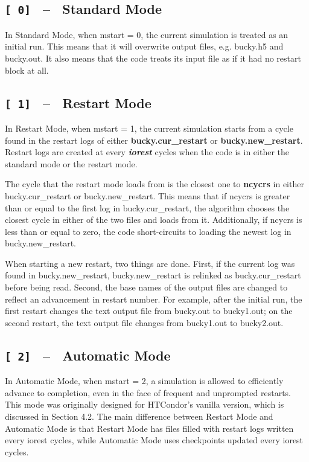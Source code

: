 
\subsection{\texttt{[ 0]} \ -- \ Standard Mode}

In Standard Mode, when mstart = 0, the current simulation is treated as an initial run.  This means that it will overwrite output files, e.g. bucky.h5 and bucky.out.  It also means that the code treats its input file as if it had no restart block at all.

\subsection{\texttt{[ 1]} \ -- \ Restart Mode }

In Restart Mode, when mstart = 1, the current simulation starts from a cycle found in the restart logs of either \textbf{bucky.cur\_restart} or \textbf{bucky.new\_restart}.  Restart logs are created at every \textbf{\textit{iorest}} cycles when the code is in either the standard mode or the restart mode.

\pagebreak

The cycle that the restart mode loads from is the closest one to \textbf{ncycrs} in either bucky.cur\_restart or bucky.new\_restart.  This means that if ncycrs is greater than or equal to the first log in bucky.cur\_restart, the algorithm chooses the closest cycle in either of the two files and loads from it.  Additionally, if ncycrs is less than or equal to zero, the code short-circuits to loading the newest log in bucky.new\_restart.

When starting a new restart, two things are done.  First, if the current log was found in bucky.new\_restart, bucky.new\_restart is relinked as bucky.cur\_restart before being read. Second, the base names of the output files are changed to reflect an advancement in restart number.  For example, after the initial run, the first restart changes the text output file from bucky.out to bucky1.out; on the second restart, the text output file changes from bucky1.out to bucky2.out.

\subsection{\texttt{[ 2]} \ -- \ Automatic Mode  }

In Automatic Mode, when mstart = 2, a simulation is allowed to efficiently advance to completion, even in the face of frequent and unprompted restarts.  This mode was originally designed for HTCondor's vanilla version, which is discussed in Section 4.2.  The main difference between Restart Mode and Automatic Mode is that Restart Mode has files filled with restart logs written every iorest cycles, while Automatic Mode uses checkpoints updated every iorest cycles.  

